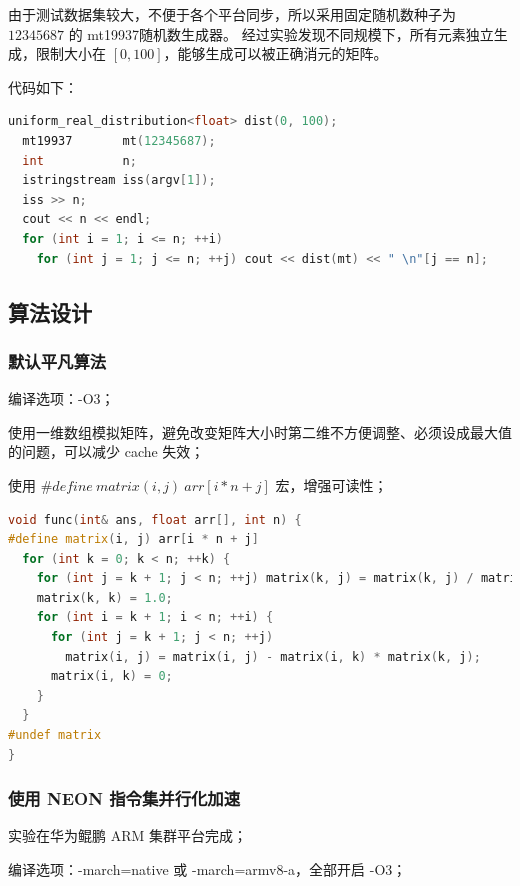 \documentclass[a4paper]{article}
\begin{document}
由于测试数据集较大，不便于各个平台同步，所以采用固定随机数种子为 $12345687$ 的 mt19937随机数生成器。
经过实验发现不同规模下，所有元素独立生成，限制大小在 $[0, 100]$，能够生成可以被正确消元的矩阵。

代码如下：

\begin{lstlisting}[title=测试数据集生成器,frame=trbl,language={C++}]
  uniform_real_distribution<float> dist(0, 100);
  mt19937       mt(12345687);
  int           n;
  istringstream iss(argv[1]);
  iss >> n;
  cout << n << endl;
  for (int i = 1; i <= n; ++i)
    for (int j = 1; j <= n; ++j) cout << dist(mt) << " \n"[j == n];
\end{lstlisting}

\subsection{算法设计}

\subsubsection{默认平凡算法}

编译选项：-O3；

使用一维数组模拟矩阵，避免改变矩阵大小时第二维不方便调整、必须设成最大值的问题，可以减少 cache 失效；

使用 $\#define\ matrix(i, j)\ arr[i * n + j]$ 宏，增强可读性；

\begin{lstlisting}[title=平凡算法,frame=trbl,language={C++}]
void func(int& ans, float arr[], int n) {
#define matrix(i, j) arr[i * n + j]
  for (int k = 0; k < n; ++k) {
    for (int j = k + 1; j < n; ++j) matrix(k, j) = matrix(k, j) / matrix(k, k);
    matrix(k, k) = 1.0;
    for (int i = k + 1; i < n; ++i) {
      for (int j = k + 1; j < n; ++j)
        matrix(i, j) = matrix(i, j) - matrix(i, k) * matrix(k, j);
      matrix(i, k) = 0;
    }
  }
#undef matrix
}
\end{lstlisting}

\subsubsection{使用 NEON 指令集并行化加速}

实验在华为鲲鹏 ARM 集群平台完成；

编译选项：-march=native 或 -march=armv8-a，全部开启 -O3；
\end{document}
